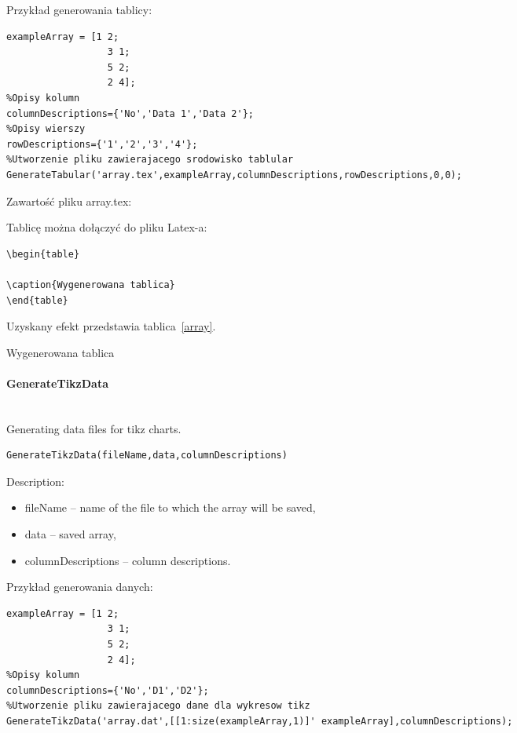 Przykład generowania tablicy: 
\begin{lstlisting}[style=Matlab-editor]
%Tablica
exampleArray = [1 2;
                  3 1;
                  5 2;
                  2 4];
%Opisy kolumn
columnDescriptions={'No','Data 1','Data 2'};
%Opisy wierszy
rowDescriptions={'1','2','3','4'};
%Utworzenie pliku zawierajacego srodowisko tablular
GenerateTabular('array.tex',exampleArray,columnDescriptions,rowDescriptions,0,0);
\end{lstlisting}

Zawartość pliku array.tex:


Tablicę można dołączyć do pliku Latex-a: 
\begin{lstlisting}[style=lstStyleLaTeX]
\begin{table}

\caption{Wygenerowana tablica}
\end{table}
\end{lstlisting}

Uzyskany efekt przedstawia tablica~\ref{array}.

\begin{table}

\caption{Wygenerowana tablica}
\label{array}
\end{table}

\paragraph{GenerateTikzData} \hspace{0pt} \\
Generating data files for tikz charts.
\begin{lstlisting}[style=Matlab-editor]
GenerateTikzData(fileName,data,columnDescriptions)
\end{lstlisting}

Description:
\begin{itemize}
\item fileName -- name of the file to which the array will be saved,
\item data -- saved array,
\item columnDescriptions -- column descriptions.
\end{itemize}

Przykład generowania danych: 
\begin{lstlisting}[style=Matlab-editor]
%Tablica
exampleArray = [1 2;
                  3 1;
                  5 2;
                  2 4];
%Opisy kolumn
columnDescriptions={'No','D1','D2'};
%Utworzenie pliku zawierajacego dane dla wykresow tikz
GenerateTikzData('array.dat',[[1:size(exampleArray,1)]' exampleArray],columnDescriptions);
\end{lstlisting}

